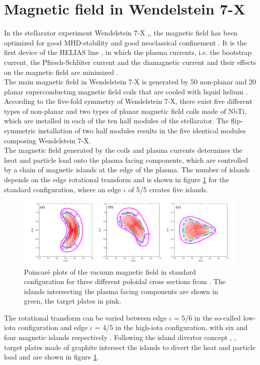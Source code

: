 \section{Magnetic field in Wendelstein 7-X}
In the stellarator experiment Wendelstein 7-X \cite{Beidler1990},\cite{Klinger2013}, the magnetic field has been optimized for good MHD-stability and good neoclassical confinement \cite{Grieger1992}. It is the first device of the HELIAS line \cite{Nuhrenberg1986}, in which the plasma currents, i.e. the bootstrap current, the Pfirsch-Schlüter current and the diamagnetic current and their effects on the magnetic field are minimized \cite{Dinklage2018}.\\
The main magnetic field in Wendelstein 7-X is generated by 50 non-planar and 20 planar superconducting magnetic field coils that are cooled with liquid helium \cite{Rummel2012}. According to the five-fold symmetry of Wendelstein 7-X, there exist five different types of non-planar and two types of planar magnetic field coils made of NbTi, which are installed in each of the ten half modules of the stellarator. The flip-symmetric installation of two half modules results in the five identical modules composing Wendelstein 7-X. \\
The magnetic field generated by the coils and plasma currents determines the heat and particle load onto the plasma facing components, which are controlled by a chain of magnetic islands at the edge of the plasma. The number of islands depends on the edge rotational transform and is shown in figure \ref{fig:1} for the standard configuration, where an edge $\iota$ of 5/5 creates five islands.
\begin{figure}[!htb]
    \centering
    \includegraphics[width=\textwidth]{images/islands.png}
    \caption{Poincaré plots of the vacuum magnetic field in standard configuration for three different poloidal cross sections from \cite{Suzuki2016}. The islands intersecting the plasma facing components are shown in green, the target plates in pink.} \label{fig:1}
\end{figure}

The rotational transform can be varied between edge $\iota$ = 5/6 in the so-called low-iota configuration and edge $\iota$ = 4/5 in the high-iota configuration, with six and four magnetic islands respectively \cite{Knieps2021}. Following the island divertor concept \cite{Konig2002}, \cite{Renner2002}, target plates made of graphite intersect the islands to divert the heat and particle load and are shown in figure \ref{fig:1}.



